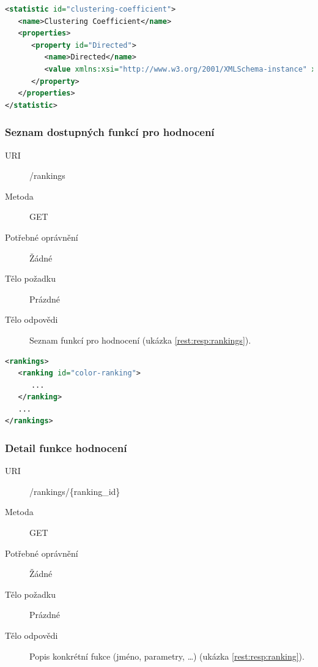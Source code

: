 \documentclass[thesis=M,czech]{FITthesis}[2014/05/6]
\begin{document}
\begin{lstlisting}[caption=Tělo odpovědi zdroje /statistics/\{statistic\_id\} (GET), label=rest:resp:statistic, language=xml]
<statistic id="clustering-coefficient">
   <name>Clustering Coefficient</name>
   <properties>
      <property id="Directed">
         <name>Directed</name>
         <value xmlns:xsi="http://www.w3.org/2001/XMLSchema-instance" xmlns:xs="http://www.w3.org/2001/XMLSchema" xsi:type="xs:boolean">false</value>
      </property>
   </properties>
</statistic>
\end{lstlisting}  

\subsubsection{Seznam dostupných funkcí pro hodnocení}
\begin{description}
  \item[URI] /rankings
  \item[Metoda] GET
  \item[Potřebné oprávnění] Žádné
  \item[Tělo požadku] Prázdné
  \item[Tělo odpovědi] Seznam funkcí pro hodnocení (ukázka \ref{rest:resp:rankings}).
\end{description}

\begin{lstlisting}[caption=Tělo odpovědi zdroje /rankings (GET), label=rest:resp:rankings, language=xml]
<rankings>
   <ranking id="color-ranking">
      ...
   </ranking>
   ...
</rankings>
\end{lstlisting}  

\subsubsection{Detail funkce hodnocení}
\begin{description}
  \item[URI] /rankings/\{ranking\_id\}
  \item[Metoda] GET
  \item[Potřebné oprávnění] Žádné
  \item[Tělo požadku] Prázdné
  \item[Tělo odpovědi] Popis konkrétní fukce (jméno, parametry, \ldots) (ukázka \ref{rest:resp:ranking}).
\end{description}
\end{document}
